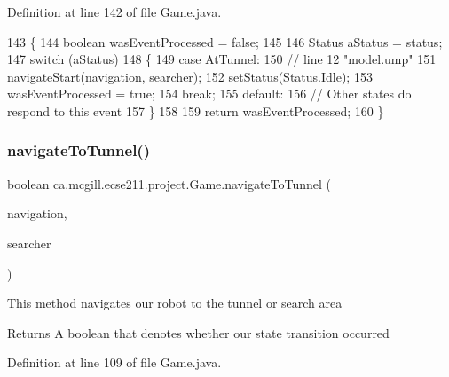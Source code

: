 Definition at line 142 of file Game.\+java.


\begin{DoxyCode}
143   \{
144     \textcolor{keywordtype}{boolean} wasEventProcessed = \textcolor{keyword}{false};
145     
146     Status aStatus = status;
147     \textcolor{keywordflow}{switch} (aStatus)
148     \{
149       \textcolor{keywordflow}{case} AtTunnel:
150         \textcolor{comment}{// line 12 "model.ump"}
151         navigateStart(navigation, searcher);
152         setStatus(Status.Idle);
153         wasEventProcessed = \textcolor{keyword}{true};
154         \textcolor{keywordflow}{break};
155       \textcolor{keywordflow}{default}:
156         \textcolor{comment}{// Other states do respond to this event}
157     \}
158 
159     \textcolor{keywordflow}{return} wasEventProcessed;
160   \}
\end{DoxyCode}
\mbox{\label{enumca_1_1mcgill_1_1ecse211_1_1project_1_1_game_ad3d03cffa33c927317d8fcba0c928a24}} 
\subsubsection{\texorpdfstring{navigate\+To\+Tunnel()}{navigateToTunnel()}}
{\footnotesize\ttfamily boolean ca.\+mcgill.\+ecse211.\+project.\+Game.\+navigate\+To\+Tunnel (\begin{DoxyParamCaption}\item[{\hyperlink{classca_1_1mcgill_1_1ecse211_1_1project_1_1_navigation}{Navigation}}]{navigation,  }\item[{\hyperlink{classca_1_1mcgill_1_1ecse211_1_1threads_1_1_ring_searcher}{Ring\+Searcher}}]{searcher }\end{DoxyParamCaption})}

This method navigates our robot to the tunnel or search area

\begin{DoxyReturn}{Returns}
A boolean that denotes whether our state transition occurred 
\end{DoxyReturn}


Definition at line 109 of file Game.\+java.


